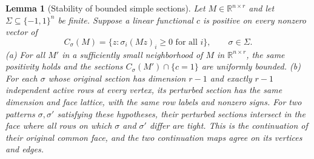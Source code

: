 \documentclass[11pt]{article}
\newtheorem{lemma}[theorem]{Lemma}
\theoremstyle{remark}
\newcommand{\R}{\mathbb R}
\begin{document}
\begin{lemma}[Stability of bounded simple sections]\label{lem:stability}
Let $M\in\R^{n\times r}$ and let $\Sigma\subseteq\{-1,1\}^n$ be finite.
Suppose a linear functional $c$ is positive on every nonzero vector of
\[
 C_\sigma(M)=\{z:\sigma_i(Mz)_i\ge0\text{ for all }i\},
 \qquad \sigma\in\Sigma.
\]
\textup{(a)} For all $M'$ in a sufficiently small neighborhood of $M$ in
$\R^{n\times r}$, the same positivity
holds and the sections $C_\sigma(M')\cap\{c=1\}$ are uniformly bounded.
\textup{(b)} For each $\sigma$ whose original section has dimension $r-1$ and
exactly $r-1$ independent active rows at every vertex, its perturbed
section has the same dimension and face lattice,
with the same row labels and nonzero signs. For two patterns
$\sigma,\sigma'$ satisfying these hypotheses, their perturbed sections
intersect in the face where all rows on which $\sigma$ and $\sigma'$
differ are tight. This is the continuation of their original common face,
and the two continuation maps agree on its vertices and edges.
\end{lemma}
\end{document}
